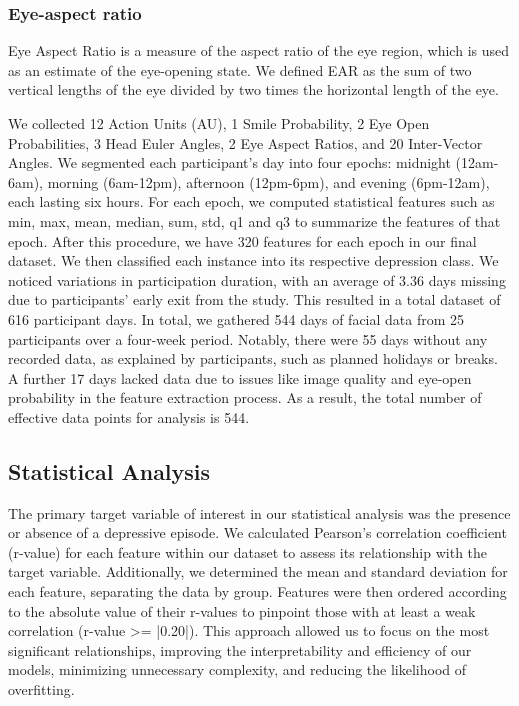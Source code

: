 \subsubsection*{Eye-aspect ratio}
Eye Aspect Ratio is a measure of the aspect ratio of the eye region, which is used as an estimate of the eye-opening state. We defined EAR as the sum of two vertical lengths of the eye divided by two times the horizontal length of the eye. 

We collected 12 Action Units (AU), 1 Smile Probability, 2 Eye Open Probabilities, 3 Head Euler Angles, 2 Eye Aspect Ratios, and 20 Inter-Vector Angles. We segmented each participant's day into four epochs: midnight (12am-6am), morning (6am-12pm), afternoon (12pm-6pm), and evening (6pm-12am), each lasting six hours. For each epoch, we computed statistical features such as min, max, mean, median, sum, std, q1 and q3 to summarize the features of that epoch. After this procedure, we have 320 features for each epoch in our final dataset. We then classified each instance into its respective depression class. We noticed variations in participation duration, with an average of 3.36 days missing due to participants' early exit from the study. This resulted in a total dataset of 616 participant days. In total, we gathered 544 days of facial data from 25 participants over a four-week period. Notably, there were 55 days without any recorded data, as explained by participants, such as planned holidays or breaks. A further 17 days lacked data due to issues like image quality and eye-open probability in the feature extraction process. As a result, the total number of effective data points for analysis is 544.

\subsection{Statistical Analysis}
The primary target variable of interest in our statistical analysis was the presence or absence of a depressive episode. We calculated Pearson's correlation coefficient (r-value) for each feature within our dataset to assess its relationship with the target variable. Additionally, we determined the mean and standard deviation for each feature, separating the data by group. Features were then ordered according to the absolute value of their r-values to pinpoint those with at least a weak correlation (r-value >= |0.20|). This approach allowed us to focus on the most significant relationships, improving the interpretability and efficiency of our models, minimizing unnecessary complexity, and reducing the likelihood of overfitting.

